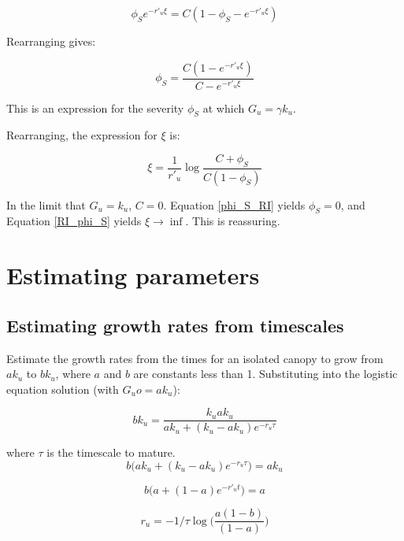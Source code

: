 \documentclass{article}
\begin{document}
\begin{equation}
{ \phi_S  e^{-r'_u \xi}} = C ({1- \phi_S - e^{-r'_u \xi}} )
\end{equation}

Rearranging gives:

\begin{equation}
 \phi_S   =  \frac{C(1 - e^{-r'_u \xi})}{C  - e^{-r'_u \xi}}
 \label{phi_S_RI}
 \end{equation}

This is an expression for the severity $ \phi_S $ at which $G_u = \gamma k_u$.

Rearranging, the expression for $\xi$ is:


\begin{equation}
\xi   =  \frac{1}{r'_u}\log \frac{C  +\phi_S } {C(1 - \phi_S)}
 \label{RI_phi_S}
 \end{equation}

In the limit that  $G_u = k_u$, $C=0$.
 Equation \ref{phi_S_RI} yields $\phi_S = 0$,  and Equation \ref{RI_phi_S} yields $\xi \rightarrow \inf$.
 This is reassuring.



\section{Estimating parameters}
\subsection{Estimating growth rates from timescales}

Estimate the growth rates from the times for an isolated canopy to grow from $a k_u$ to $b k_u$, where $a$ and $b$ are constants less than 1.
Substituting into the logistic equation solution (with $ G_uo = a k_u$):

\begin{equation}
    b k_u = \frac{k_u  a k_u }{ a k_u +(k_u- a k_u) e^{-r_u \tau}}
\end{equation}

where $\tau$ is the timescale to mature.
\begin{equation}
    b ({ a k_u +(k_u- a k_u) e^{-r_u \tau}) ={ a k_u }}
\end{equation}

\begin{equation}
    b ({ a  +(1- a ) e^{-r'_u t}) ={ a  }}
\end{equation}

\begin{equation}
r_u =   - 1/ \tau \log \big(\frac{a (1-b) }{(1- a )}\big)
\end{equation}
\end{document}
